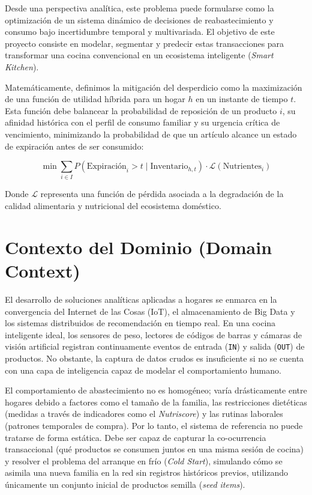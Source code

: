 \documentclass[11pt,a4paper]{article}
\begin{document}
Desde una perspectiva analítica, este problema puede formularse como la optimización de un sistema dinámico de decisiones de reabastecimiento y consumo bajo incertidumbre temporal y multivariada. El objetivo de este proyecto consiste en modelar, segmentar y predecir estas transacciones para transformar una cocina convencional en un ecosistema inteligente (\textit{Smart Kitchen}).

Matemáticamente, definimos la mitigación del desperdicio como la maximización de una función de utilidad híbrida para un hogar $h$ en un instante de tiempo $t$. Esta función debe balancear la probabilidad de reposición de un producto $i$, su afinidad histórica con el perfil de consumo familiar y su urgencia crítica de vencimiento, minimizando la probabilidad de que un artículo alcance un estado de expiración antes de ser consumido:

\begin{equation}
\min \sum_{i \in I} P(\text{Expiración}_i > t \mid \text{Inventario}_{h,t}) \cdot \mathcal{L}(\text{Nutrientes}_i)
\end{equation}

Donde $\mathcal{L}$ representa una función de pérdida asociada a la degradación de la calidad alimentaria y nutricional del ecosistema doméstico.

\section{Contexto del Dominio (Domain Context)}
El desarrollo de soluciones analíticas aplicadas a hogares se enmarca en la convergencia del Internet de las Cosas (IoT), el almacenamiento de Big Data y los sistemas distribuidos de recomendación en tiempo real. En una cocina inteligente ideal, los sensores de peso, lectores de códigos de barras y cámaras de visión artificial registran continuamente eventos de entrada (\texttt{IN}) y salida (\texttt{OUT}) de productos. No obstante, la captura de datos crudos es insuficiente si no se cuenta con una capa de inteligencia capaz de modelar el comportamiento humano.

El comportamiento de abastecimiento no es homogéneo; varía drásticamente entre hogares debido a factores como el tamaño de la familia, las restricciones dietéticas (medidas a través de indicadores como el \textit{Nutriscore}) y las rutinas laborales (patrones temporales de compra). Por lo tanto, el sistema de referencia no puede tratarse de forma estática. Debe ser capaz de capturar la co-ocurrencia transaccional (qué productos se consumen juntos en una misma sesión de cocina) y resolver el problema del arranque en frío (\textit{Cold Start}), simulando cómo se asimila una nueva familia en la red sin registros históricos previos, utilizando únicamente un conjunto inicial de productos semilla (\textit{seed items}).
\end{document}
